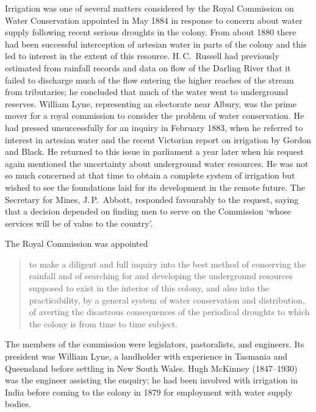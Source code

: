 Irrigation was one of several matters considered by the Royal
Commission on Water Conservation appointed in May 1884 in response to
concern about water supply following recent serious droughts in the
colony.  From about 1880 there had been successful interception of
artesian water in parts of the colony and this led to interest in the
extent of this resource.  H.\,C.~Russell  had
previously estimated from rainfall records and data on flow of the
Darling River  that it failed to discharge much
of the flow entering the higher reaches of the stream from
tributaries; he concluded that much of the water went to underground
reserves.  William Lyne,  representing an electorate
near Albury, was the prime mover for a royal commission to consider
the problem of water conservation.  He had pressed unsuccessfully for
an inquiry in February 1883, when he referred to interest in artesian
water and the recent Victorian report on irrigation by Gordon and
Black.  He returned to this issue in parliament a year later when his
request again mentioned the uncertainty about underground water
resources.  He was not so much concerned at that time to obtain a
complete system of irrigation but wished to see the foundations laid
for its development in the remote future.  The Secretary for Mines,
J.\,P.~Abbott,  responded favourably to the
request, saying that a decision depended on finding men to serve on
the Commission `whose services will be of value to the
country'.

The Royal Commission was appointed
\begin{quote}
	to make a diligent and full inquiry into the best method of
	conserving the rainfall and of searching for and developing
	the underground resources supposed to exist in the interior of
	this colony, and also into the practicability, by a general
	system of water conservation and distribution, of averting the
	disastrous consequences of the periodical droughts to which
	the colony is from time to time subject.
\end{quote}
The members of the commission were legislators, pastoralists, and
engineers. Its president was William Lyne, a landholder with
experience in Tasmania and Queensland before settling in New South
Wales. Hugh McKinney  (1847--1930) was the
engineer assisting the enquiry; he had been involved with irrigation
in India before coming to the colony in 1879 for employment with water
supply bodies.

